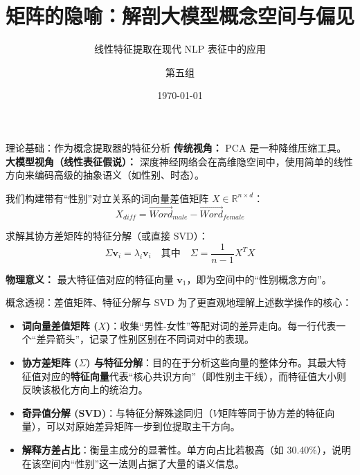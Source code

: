 \documentclass[aspectratio=169]{beamer}
\title[矩阵分析与概念子空间]{矩阵的隐喻：解剖大模型概念空间与偏见}
\subtitle{线性特征提取在现代 NLP 表征中的应用}
\author[第五组]{第五组}
\institute[NJU]{南京大学}
\date{\today}
\begin{document}
\begin{frame}
    \titlepage
\end{frame}

\begin{frame}{理论基础：作为概念提取器的特征分析}
    \textbf{传统视角：} PCA 是一种降维压缩工具。\\
    \textbf{大模型视角（线性表征假说）：} 深度神经网络会在高维隐空间中，使用简单的线性方向来编码高级的抽象语义（如性别、时态）。
    
    \vspace{0.5cm}
    我们构建带有“性别”对立关系的词向量差值矩阵 $X \in \mathbb{R}^{n \times d}$：
    $$X_{diff} = \vec{Word}_{male} - \vec{Word}_{female}$$
    
    求解其协方差矩阵的特征分解（或直接 SVD）：
    $$\Sigma \mathbf{v}_i = \lambda_i \mathbf{v}_i \quad \text{其中} \quad \Sigma = \frac{1}{n-1} X^T X$$
    
    \textbf{物理意义：} 最大特征值对应的特征向量 $\mathbf{v}_1$，即为空间中的“性别概念方向”。
\end{frame}

\begin{frame}{概念透视：差值矩阵、特征分解与 SVD}
    为了更直观地理解上述数学操作的核心：
    \begin{itemize}
        \item \textbf{词向量差值矩阵 ($X$)}：收集“男性-女性”等配对词的差异走向。每一行代表一个“差异箭头”，记录了性别区别在不同词对中的表现。
        \item \textbf{协方差矩阵 ($\Sigma$) 与特征分解}：目的在于分析这些向量的整体分布。其最大特征值对应的\textbf{特征向量}代表“核心共识方向”（即性别主干线），而特征值大小则反映该极化方向上的统治力。
        \item \textbf{奇异值分解 (SVD)}：与特征分解殊途同归（$V$矩阵等同于协方差的特征向量），可以对原始差异矩阵一步到位提取主干方向。
        \item \textbf{解释方差占比}：衡量主成分的显著性。单方向占比若极高（如 30.40\%），说明在该空间内“性别”这一法则占据了大量的语义信息。
    \end{itemize}
\end{frame}
\end{document}
